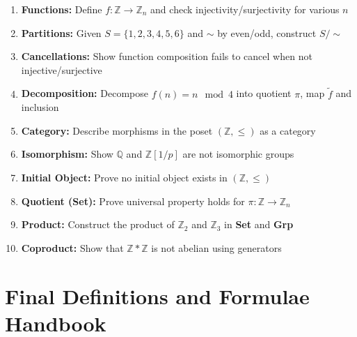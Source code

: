 \documentclass[10pt]{article}
\theoremstyle{plain}
\theoremstyle{definition}
\begin{document}
  \begin{enumerate}
  	\item \textbf{Functions:} Define $f: \mathbb{Z} \to \mathbb{Z}_n$ and check injectivity/surjectivity for various $n$
  	\item \textbf{Partitions:} Given $S = \{1,2,3,4,5,6\}$ and $\sim$ by even/odd, construct $S/{\sim}$
  	\item \textbf{Cancellations:} Show function composition fails to cancel when not injective/surjective
  	\item \textbf{Decomposition:} Decompose $f(n) = n \mod 4$ into quotient $\pi$, map $\tilde{f}$ and inclusion
  	\item \textbf{Category:} Describe morphisms in the poset $(\mathbb{Z}, \le)$ as a category
  	\item \textbf{Isomorphism:} Show $\mathbb{Q}$ and $\mathbb{Z}[1/p]$ are not isomorphic groups
  	\item \textbf{Initial Object:} Prove no initial object exists in $(\mathbb{Z}, \le)$
  	\item \textbf{Quotient (Set):} Prove universal property holds for $\pi: \mathbb{Z} \to \mathbb{Z}_n$
  	\item \textbf{Product:} Construct the product of $\mathbb{Z}_2$ and $\mathbb{Z}_3$ in \textbf{Set} and \textbf{Grp}
  	\item \textbf{Coproduct:} Show that $\mathbb{Z} * \mathbb{Z}$ is not abelian using generators
  \end{enumerate}
  
  \section*{Final Definitions and Formulae Handbook}
  
\end{document}
